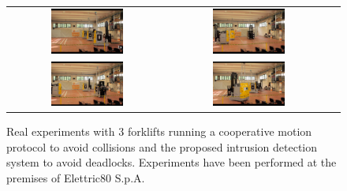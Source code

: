 \documentclass[journal, onecolumn, 12pt]{styles/IEEEtran}
\begin{document}
\begin{figure}[!]
\centering
\begin{tabular}{ccc}
\includegraphics[width=0.48\textwidth,clip]{images/viano11.png} &
\includegraphics[width=0.48\textwidth,clip]{images/viano21.png} \\
\includegraphics[width=0.48\textwidth,clip]{images/viano31.png} &
\includegraphics[width=0.48\textwidth,clip]{images/viano41.png} 
\end{tabular}
\caption{Real experiments with $3$ forklifts running a cooperative motion protocol to avoid collisions and the proposed intrusion detection system to avoid deadlocks. Experiments have been performed at the premises of Elettric80 S.p.A.}
\label{fig:viano}
\end{figure}
\end{document}
